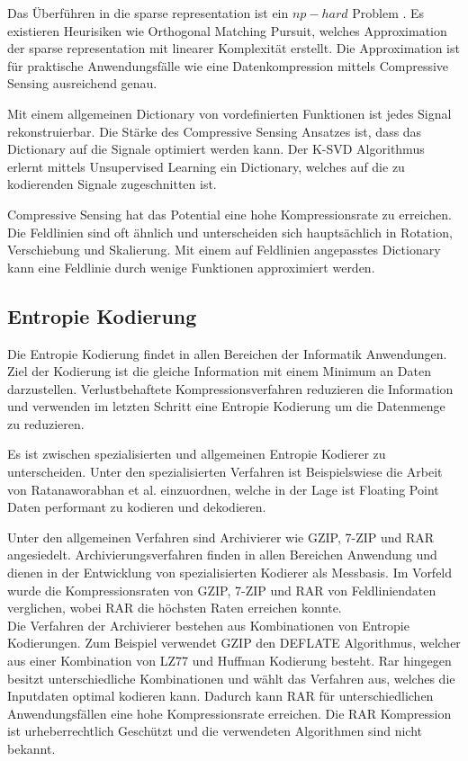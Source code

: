 Das Überführen in die sparse representation ist ein $np-hard$ Problem \cite{wiki:npHard}. Es existieren Heurisiken wie Orthogonal Matching Pursuit\cite{tropp2007signal}, welches Approximation der sparse representation mit linearer Komplexität erstellt. Die Approximation ist für praktische Anwendungsfälle wie eine Datenkompression mittels Compressive Sensing ausreichend genau.

Mit einem allgemeinen Dictionary von vordefinierten Funktionen ist jedes Signal rekonstruierbar. Die Stärke des Compressive Sensing Ansatzes ist, dass das Dictionary auf die Signale optimiert werden kann. Der K-SVD \cite{bryt2008compression} Algorithmus erlernt mittels Unsupervised Learning ein Dictionary, welches auf die zu kodierenden Signale zugeschnitten ist. 

Compressive Sensing hat das Potential eine hohe Kompressionsrate zu erreichen. Die Feldlinien sind oft ähnlich und unterscheiden sich hauptsächlich in Rotation, Verschiebung und Skalierung. Mit einem auf Feldlinien angepasstes Dictionary kann eine Feldlinie durch wenige Funktionen approximiert werden.

\subsection{Entropie Kodierung}
Die Entropie Kodierung findet in allen Bereichen der Informatik Anwendungen. Ziel der Kodierung ist die gleiche Information mit einem Minimum an Daten darzustellen. Verlustbehaftete Kompressionsverfahren reduzieren die Information und verwenden im letzten Schritt eine Entropie Kodierung um die Datenmenge zu reduzieren.

Es ist zwischen spezialisierten und allgemeinen Entropie Kodierer zu unterscheiden. Unter den spezialisierten Verfahren ist Beispielswiese die Arbeit von Ratanaworabhan et al.\cite{ratanaworabhan2006fast} einzuordnen, welche in der Lage ist Floating Point Daten performant zu kodieren und dekodieren.
 
Unter den allgemeinen Verfahren sind Archivierer wie GZIP\cite{website:gzip}, 7-ZIP\cite{website:7zip} und RAR\cite{website:rar} angesiedelt. Archivierungsverfahren finden in allen Bereichen Anwendung und dienen in der Entwicklung von spezialisierten Kodierer als Messbasis. Im Vorfeld wurde die Kompressionsraten von GZIP, 7-ZIP und RAR von Feldliniendaten verglichen, wobei RAR die höchsten Raten erreichen konnte.\\
Die Verfahren der Archivierer bestehen aus Kombinationen von Entropie Kodierungen. Zum Beispiel verwendet GZIP den DEFLATE Algorithmus\cite{deutsch1996deflate}, welcher aus einer Kombination von LZ77\cite{ziv1977universal} und Huffman\cite{huffman1952method} Kodierung besteht. Rar hingegen besitzt unterschiedliche Kombinationen und wählt das Verfahren aus, welches die Inputdaten optimal kodieren kann. Dadurch kann RAR für unterschiedlichen Anwendungsfällen eine hohe Kompressionsrate erreichen. Die RAR Kompression ist urheberrechtlich Geschützt und die verwendeten Algorithmen sind nicht bekannt.